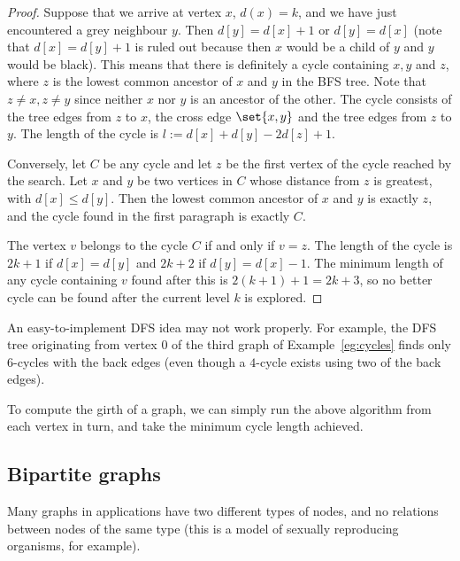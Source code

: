 \begin{proof}

Suppose that we arrive at vertex $x$, $d(x) = k$, and we have just
encountered a grey neighbour $y$. Then $d[y] = d[x] + 1$ or $d[y] = d[x]$
(note that $d[x] = d[y] + 1$ is ruled out because then $x$ would be a
child of $y$ and $y$ would be black). This means that there is definitely
a cycle containing $x, y$ and $z$, where $z$ is the lowest common ancestor
of $x$ and $y$ in the BFS tree. Note that $z\neq x, z\neq y$ since neither
$x$ nor $y$ is an ancestor of the other. The cycle consists of the tree
edges from $z$ to $x$, the cross edge $\set{x,y}$ and the tree edges
from $z$ to $y$. The length of the cycle is $l:=d[x] + d[y] - 2 d[z] + 1$.

Conversely, let $C$ be any cycle and let $z$ be the first vertex of
the cycle reached by the search. Let $x$ and $y$ be two vertices in $C$
whose distance  from $z$ is greatest, with $d[x] \leq d[y]$. Then the
lowest common ancestor of  $x$ and $y$ is exactly $z$, and the cycle
found in the first paragraph is exactly $C$.

The vertex $v$ belongs to the cycle $C$ if and only if $v = z$. The
length of the cycle is $2k+1$ if $d[x] = d[y]$ and $2k+2$ if $d[y] =
d[x] - 1$. The minimum length of any cycle containing $v$ found after
this is $2(k+1) + 1 = 2k+3$, so no better cycle can be found after the
current level $k$ is explored.

\end{proof}

\begin{note}

An easy-to-implement DFS idea may not work properly. For example,
the DFS tree originating from vertex $0$ of the third graph of
Example~\ref{eg:cycles} finds only $6$-cycles with the back edges (even
though a $4$-cycle exists using two of the back edges).

\end{note}

To compute the girth of a graph, we can simply run the above algorithm
from each vertex in turn, and take the minimum cycle length achieved.

\subsection{Bipartite graphs}
\label{subsec:bipartite}

Many graphs in applications have two different types of nodes, and no
relations between nodes of the same type (this is a model of sexually
reproducing organisms, for example).

